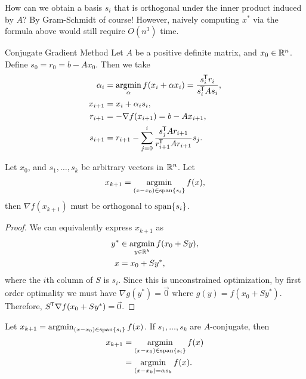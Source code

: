 How can we obtain a basis $s_i$ that is orthogonal under the inner product induced by $A$? By Gram-Schmidt of course! However, naively computing $x^*$ via the formula above would still require $O(n^3)$ time.

\begin{defn}{Conjugate Gradient Method}\proofbreak
    Let $A$ be a positive definite matrix, and $x_0 \in \mathbb{R}^n$. Define $s_0 = r_0 = b - Ax_0$. Then we take
    \begin{align*}
        \alpha_i &= \operatorname*{argmin}_{\alpha}f(x_i + \alpha x_i) = \frac{s_i^{\mkern-1.5mu\mathsf{T}}r_i}{s_i^{\mkern-1.5mu\mathsf{T}}As_i}, \\
        x_{i+1} &= x_i + \alpha_is_i, \\
        r_{i+1} &= -\nabla f(x_{i+1}) = b - Ax_{i+1}, \\
        s_{i+1} &= r_{i+1} - \sum_{j=0}^i\frac{s_j^{\mkern-1.5mu\mathsf{T}}Ar_{i+1}}{r_{i+1}^{\mkern-1.5mu\mathsf{T}}Ar_{i+1}}s_j.
    \end{align*}
\end{defn}

\begin{lemma}\label{lemma:conjugate-gradient-1}
    Let $x_0$, and $s_1, \ldots, s_k$ be arbitrary vectors in $\mathbb{R}^n$. Let
    \begin{align*}
        x_{k+1} = \operatorname*{argmin}_{(x-x_0) \in \operatorname{span}\{s_i\}}f(x),
    \end{align*}
    then $\nabla f(x_{k+1})$ must be orthogonal to $\operatorname{span}\{s_i\}$.
\end{lemma}

\begin{proof}
    We can equivalently express $x_{k+1}$ as
    \begin{align*}
        y^* &\in \operatorname*{argmin}_{y \in \mathbb{R}^k}f(x_0 + Sy), \\
        x &= x_0 + Sy^*,
    \end{align*}
    where the $i$th column of $S$ is $s_i$. Since this is unconstrained optimization, by first order optimality we must have $\nabla g(y^*) = \vec{0}$ where $g(y) = f(x_0 + Sy^*)$. Therefore, $S^{\mkern-1.5mu\mathsf{T}}\nabla f(x_0 + Sy^*) = \vec{0}$.
\end{proof}

\begin{lemma}\label{lemma:conjugate-gradient-2}
    Let $x_{k+1} = \operatorname*{argmin}_{(x-x_0) \in \operatorname{span}\{s_i\}}f(x)$. If $s_1, \ldots, s_k$ are $A$-conjugate, then
    \begin{align*}
        x_{k+1} &= \operatorname*{argmin}_{(x-x_0) \in \operatorname{span}\{s_i\}}f(x) \\
        &= \operatorname*{argmin}_{(x-x_k) = \alpha s_{k}}f(x).
    \end{align*}
\end{lemma}

